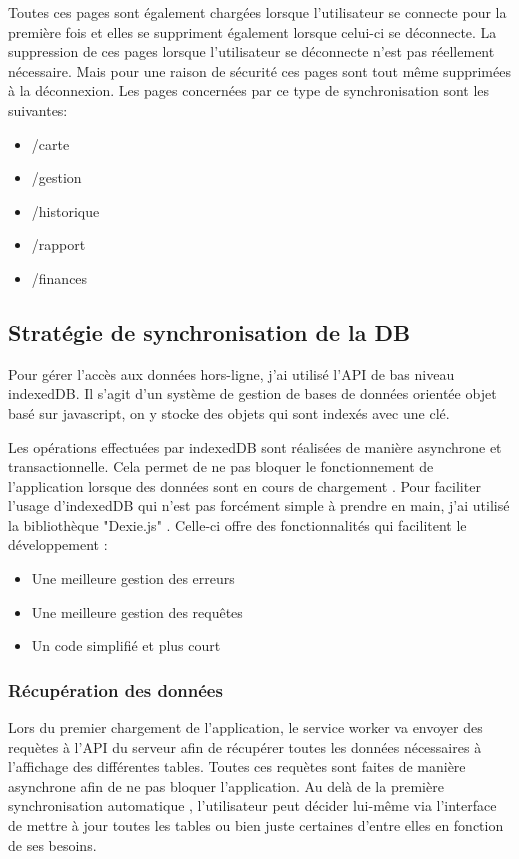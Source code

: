 \documentclass{EPL-master-thesis-covers-FR}
\begin{document}
					Toutes ces pages sont également chargées lorsque l'utilisateur se connecte pour la première fois et elles se suppriment également lorsque celui-ci se déconnecte. La suppression de ces pages lorsque l'utilisateur se déconnecte n'est pas réellement nécessaire. Mais pour une raison de sécurité ces pages sont tout même supprimées à la déconnexion. Les pages concernées par ce type de synchronisation sont les suivantes:
					\begin{itemize}
						\item /carte
						\item /gestion
						\item /historique
						\item /rapport
						\item /finances
					\end{itemize}					
				
					
			\subsection{Stratégie de synchronisation de la DB}
				Pour gérer l'accès aux données hors-ligne, j'ai utilisé l'API de bas niveau indexedDB. Il s'agit d'un système de gestion de bases de données orientée objet basé sur javascript, on y stocke des objets qui sont indexés avec une clé. 
				
				Les opérations effectuées par indexedDB sont réalisées de manière asynchrone et transactionnelle. Cela permet de ne pas bloquer le fonctionnement de l'application lorsque des données sont en cours de chargement \cite{ref:indexedDB}. Pour faciliter l'usage d'indexedDB qui n'est pas forcément simple à prendre en main, j'ai utilisé la bibliothèque "Dexie.js" \cite{ref:dexie}. Celle-ci offre des fonctionnalités qui facilitent le développement : 
				\begin{itemize}
					\item Une meilleure gestion des erreurs
					\item Une meilleure gestion des requêtes
					\item Un code simplifié et plus court
				\end{itemize}					
				
				\subsubsection*{Récupération des données}
					Lors du premier chargement de l'application, le service worker va envoyer des requètes à l'API du serveur afin de récupérer toutes les données nécessaires à l'affichage des différentes tables. Toutes ces requètes sont faites de manière asynchrone afin de ne pas bloquer l'application. Au delà de la première synchronisation automatique , l'utilisateur peut décider lui-même via l'interface de mettre à jour toutes les tables ou bien juste certaines d'entre elles en fonction de ses besoins.
				
\end{document}

